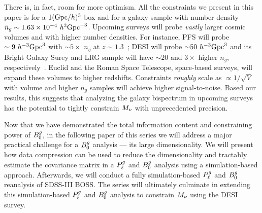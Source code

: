 There is, in fact, room for more optimism. All the constraints we present in
this paper is for a $1 ({\rm Gpc}/h)^3$ box and for a galaxy sample with number
density $\bar{n}_g \sim 1.63\times 10^{-4}~h^3{\rm Gpc}^{-3}$. Upcoming surveys
will probe {\em vastly} larger cosmic volumes and with higher number densities.
For instance, PFS will probe $\sim 9~h^{-3}{\rm Gpc}^3$ with ${\sim}5\times$ 
$n_g$ at $z\sim1.3$~\citep{takada2014}; DESI will probe ${\sim}50~h^{-3}{\rm Gpc}^3$
and its Bright Galaxy Surey and LRG sample will have ${\sim}20$ and $3\times$ 
higher $n_g$, respectively~\citep{desicollaboration2016,ruiz-macias2020}. 
Euclid and the Roman Space Telescope, space-based surveys, will expand these 
volumes to higher redshifts. Constraints {\em roughly} scale as $\propto 1/\sqrt{V}$
with volume and higher $\bar{n}_g$ samples will achieve higher signal-to-noise. 
Based our results, this suggests that analyzing the galaxy bispectrum in 
upcoming surveys has the potential to tightly constrain $M_\nu$ with unprecedented 
precision. 

Now that we have demonstrated the total information content and constraining
power of $B^g_0$, in the following paper of this series we will address a major 
practical challenge for a $B^g_0$ analysis --- its 
large dimensionality. We will present how data compression can be used to reduce 
the dimensionality and tractably estimate the covariance matrix in a $P^g_{\ell}$ and
$B^g_0$ analysis using a simulation-based approach. Afterwards, we will conduct a 
fully simulation-based $P^g_{\ell}$ and $B^g_0$ reanalysis of SDSS-III BOSS. The series
will ultimately culminate in extending this simulation-based $P^g_{\ell}$ and $B^g_0$
analysis to constrain $M_\nu$ using the DESI survey. 
